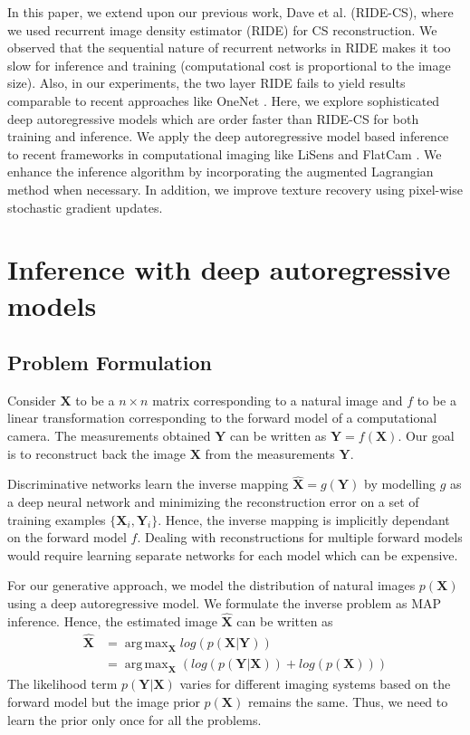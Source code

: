 \documentclass[journal,twoside]{IEEEtran}
\DeclareMathOperator*{\argmax}{arg\,max}
\newcommand{\X}{\mathbf{X}}
\newcommand{\Y}{\mathbf{Y}}
\begin{document}
In this paper, we extend upon our previous work, Dave et al. \cite{dave2017compressive} (RIDE-CS), where we used recurrent image density estimator (RIDE) for CS reconstruction. We observed that the sequential nature of recurrent networks in RIDE makes it too slow for inference and training (computational cost is proportional to the image size). Also, in our experiments, the two layer RIDE fails to yield results comparable to recent approaches like OneNet \cite{chang2017one}. Here, we explore sophisticated deep autoregressive models which are order faster than RIDE-CS for both training and inference. We apply the deep autoregressive model based inference to recent frameworks in computational imaging like LiSens \cite{wang2015lisens} and FlatCam \cite{asif2017flatcam}. We enhance the inference algorithm by incorporating the augmented Lagrangian method when necessary. 
In addition, we improve texture recovery using pixel-wise stochastic gradient updates.  


\section{Inference with deep autoregressive models}

\subsection{Problem Formulation}
Consider $\X$ to be a $n\times n$ matrix corresponding to a natural image and $f$ to be a linear transformation corresponding to the forward model of a computational camera. The measurements obtained $\Y$ can be written as $\Y = f(\X)$. Our goal is to reconstruct back the image $\X$ from the measurements $\Y$. 

Discriminative networks learn the inverse mapping $\hat{\X} = g(\Y)$ by modelling $g$ as a deep neural network and minimizing the reconstruction error on a set of training examples $\{\X_i,\Y_i\}$. Hence, the inverse mapping is implicitly dependant on the forward model $f$. Dealing with reconstructions for multiple forward models would require learning separate networks for each model which can be expensive. 

For our generative approach, we model the distribution of natural images $p(\X)$ using a deep autoregressive model.  
We formulate the inverse problem as MAP inference. Hence, the estimated image $\mathbf{\hat{X}}$ can be written as 
\begin{align}
\mathbf{\hat{X}} &= \argmax_{\X} log(p(\X|\Y))\\
&= \argmax_{\X} ( log(p(\Y|\X)) + log(p(\X)))
\end{align}
The likelihood term $p(\Y|\X)$ varies for different imaging systems based on the forward model but the image prior $p(\mathbf{\X})$ remains the same. Thus, we need to learn the prior only once for all the problems.
\end{document}
